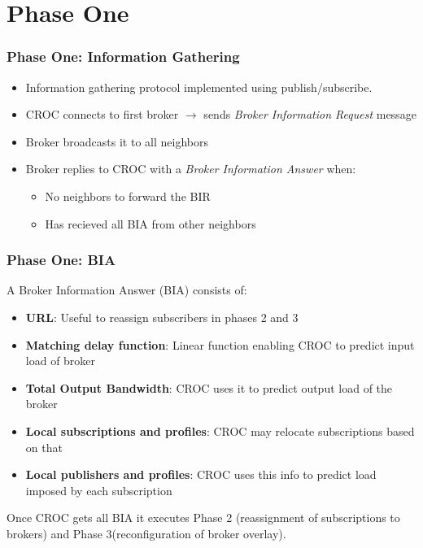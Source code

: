 \documentclass{beamer}
\begin{document}
\section{Phase One}
\begin{frame}
\frametitle{Phase One: Information Gathering}
\begin{itemize}
\item Information gathering protocol implemented using publish/subscribe.
\item CROC connects to first broker $\rightarrow$ sends \textit{Broker Information Request} message
\item Broker broadcasts it to all neighbors
\item Broker replies to CROC with a \textit{Broker Information Answer} when:
\begin{itemize}
\item No neighbors to forward the BIR
\item Has recieved all BIA from other neighbors
\end{itemize}
\end{itemize}
\end{frame}

\begin{frame}
\frametitle{Phase One: BIA}
A Broker Information Answer (BIA) consists of:
\begin{itemize}
\item\textbf{URL}: Useful to reassign subscribers in phases 2 and 3
\item\textbf{Matching delay function}: Linear function enabling CROC to predict input load of broker
\item\textbf{Total Output Bandwidth}: CROC uses it to predict output load of the broker
\item\textbf{Local subscriptions and profiles}: CROC may relocate subscriptions based on that
\item\textbf{Local publishers and profiles}: CROC uses this info to predict load imposed by each subscription
\end{itemize}


Once CROC gets all BIA it executes Phase 2 (reassignment of subscriptions to brokers) and Phase 3(reconfiguration of broker overlay).
\end{frame}
\end{document}
